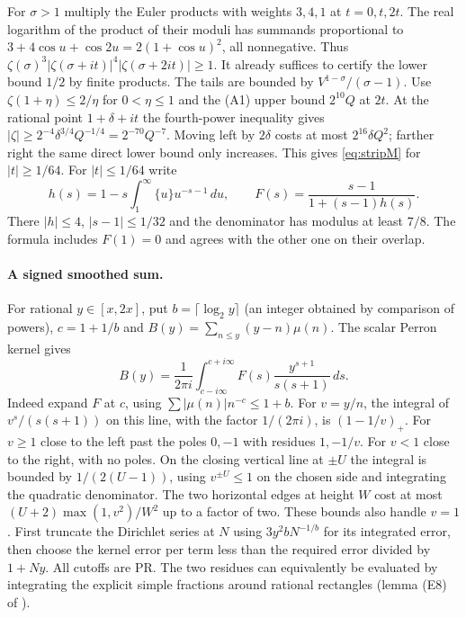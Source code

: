 For $\sigma>1$ multiply the Euler products with weights $3,4,1$ at
$t=0,t,2t$. The real logarithm of the product of their moduli has
summands proportional to $3+4\cos u+\cos 2u=2(1+\cos u)^2$,
all nonnegative. Thus
$\zeta(\sigma)^3|\zeta(\sigma+it)|^4|\zeta(\sigma+2it)|\ge1$.
It already suffices to certify the lower bound $1/2$ by finite
products. The tails are bounded by $V^{1-\sigma}/(\sigma-1)$.
Use $\zeta(1+\eta)\le2/\eta$ for $0<\eta\le1$ and the (A1)
upper bound $2^{10}Q$ at $2t$. At the rational point
$1+\delta+it$ the fourth-power inequality gives
$|\zeta|\ge2^{-4}\delta^{3/4}Q^{-1/4}=2^{-70}Q^{-7}$.
Moving left by $2\delta$ costs at most $2^{16}\delta Q^2$;
farther right the same direct lower bound only increases. This gives
\eqref{eq:stripM} for $|t|\ge1/64$.
For $|t|\le1/64$ write
\[
 h(s)=1-s\int_1^\infty\{u\}u^{-s-1}\,du,\qquad
 F(s)=\frac{s-1}{1+(s-1)h(s)} .
\]
There $|h|\le4$, $|s-1|\le1/32$ and the denominator has modulus at
least $7/8$. The formula includes $F(1)=0$ and agrees with the other
one on their overlap.

\paragraph{A signed smoothed sum.}
For rational $y\in[x,2x]$, put $b=\lceil\log_2 y\rceil$ (an integer
obtained by comparison of powers), $c=1+1/b$ and
$B(y)=\sum_{n\le y}(y-n)\mu(n)$. The scalar Perron kernel gives
\begin{equation}\label{eq:smoothM}
 B(y)=\frac1{2\pi i}\int_{c-i\infty}^{c+i\infty}
                F(s)\frac{y^{s+1}}{s(s+1)}\,ds .
\end{equation}
Indeed expand $F$ at $c$, using $\sum|\mu(n)|n^{-c}\le1+b$.
For $v=y/n$, the integral of $v^s/(s(s+1))$ on this line, with the
factor $1/(2\pi i)$, is $(1-1/v)_+$. For $v\ge1$ close to the
left past the poles $0,-1$ with residues $1,-1/v$. For $v<1$ close
to the right, with no poles. On the closing vertical line at $\pm U$
the integral is bounded by $1/(2(U-1))$, using $v^{\pm U}\le1$ on the
chosen side and integrating the quadratic denominator. The two horizontal
edges at height $W$ cost at most $(U+2)\max(1,v^2)/W^2$ up to a factor
of two. These bounds also handle $v=1$. First truncate the Dirichlet
series at $N$ using $3y^2bN^{-1/b}$ for its integrated error, then choose the kernel error per term
less than the required error divided by $1+Ny$. All cutoffs are PR.
The two residues can equivalently be evaluated by integrating the
explicit simple fractions around rational rectangles (lemma (E8) of
\cite{strip}).

